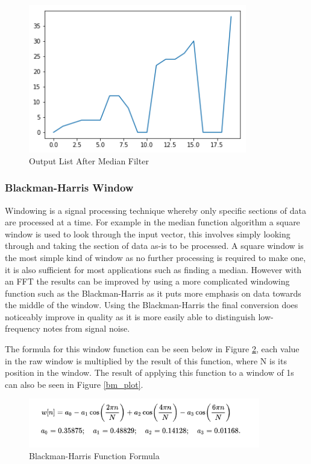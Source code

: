 \documentclass[12pt]{report}
\begin{document}
\begin{figure}[H]
	\centering
    \includegraphics[width=0.85\textwidth]{med_graph_out.png}
	\caption{Output List After Median Filter}\label{med_graph_out}
	\centering
\end{figure}

\subsubsection*{Blackman-Harris Window}
Windowing is a signal processing technique whereby only specific sections of data are processed at a time. For example in the median function algorithm a square window is used to look through the input vector, this involves simply looking through and taking the section of data as-is to be processed. A square window is the most simple kind of window as no further processing is required to make one, it is also sufficient for most applications such as finding a median. However with an FFT the results can be improved by using a more complicated windowing function such as the Blackman-Harris as it puts more emphasis on data towards the middle of the window. Using the Blackman-Harris the final conversion does noticeably improve in quality as it is more easily able to distinguish low-frequency notes from signal noise.

The formula for this window function can be seen below in Figure \ref{bm_form}, each value in the raw window is multiplied by the result of this function, where N is its position in the window. The result of applying this function to a window of 1s can also be seen in Figure \ref{bm_plot}.

\begin{figure}[H]
	\centering
    \includegraphics[width=0.9\textwidth]{blackman_harris.png}
	\caption{Blackman-Harris Function Formula}\label{bm_form}
	\centering
\end{figure}
\end{document}
